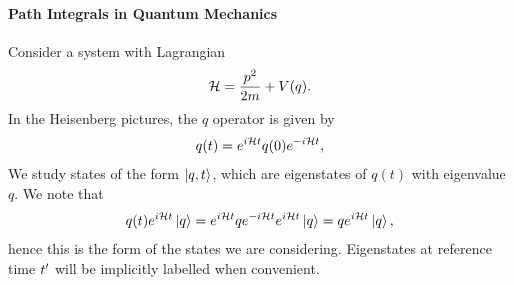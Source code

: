 \paragraph{Path Integrals in Quantum Mechanics}
Consider a system with Lagrangian
\begin{align*}
	\mathcal{H} = \frac{p^{2}}{2m} + V(q).
\end{align*}
In the Heisenberg pictures, the $q$ operator is given by
\begin{align*}
	q(t) = e^{i\mathcal{H} t}q(0)e^{-i\mathcal{H} t},
\end{align*}
We study states of the form $\ket{q, t}$, which are eigenstates of $q(t)$ with eigenvalue $q$. We note that
\begin{align*}
	q(t)e^{i\mathcal{H} t}\ket{q} = e^{i\mathcal{H} t}qe^{-i\mathcal{H} t}e^{i\mathcal{H} t}\ket{q} = qe^{i\mathcal{H} t}\ket{q},
\end{align*}
hence this is the form of the states we are considering. Eigenstates at reference time $t^{\prime}$ will be implicitly labelled when convenient.

